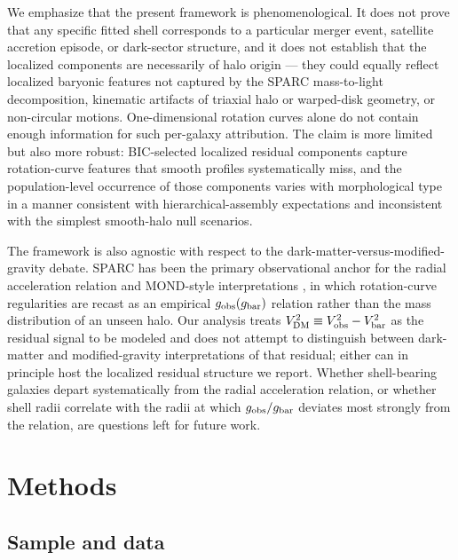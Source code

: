 We emphasize that the present framework is phenomenological. It does not prove that any specific fitted shell corresponds to a particular merger event, satellite accretion episode, or dark-sector structure, and it does not establish that the localized components are necessarily of halo origin --- they could equally reflect localized baryonic features not captured by the SPARC mass-to-light decomposition, kinematic artifacts of triaxial halo or warped-disk geometry, or non-circular motions. One-dimensional rotation curves alone do not contain enough information for such per-galaxy attribution. The claim is more limited but also more robust: BIC-selected localized residual components capture rotation-curve features that smooth profiles systematically miss, and the population-level occurrence of those components varies with morphological type in a manner consistent with hierarchical-assembly expectations and inconsistent with the simplest smooth-halo null scenarios.

The framework is also agnostic with respect to the dark-matter-versus-modified-gravity debate. SPARC has been the primary observational anchor for the radial acceleration relation and MOND-style interpretations \citep[][for a review of MOND in the rotation-curve context, see \citealt{FamaeyMcGaugh2012}]{McGaugh2016}, in which rotation-curve regularities are recast as an empirical $g_{\rm obs}(g_{\rm bar})$ relation rather than the mass distribution of an unseen halo. Our analysis treats $V^2_{\rm DM} \equiv V^2_{\rm obs} - V^2_{\rm bar}$ as the residual signal to be modeled and does not attempt to distinguish between dark-matter and modified-gravity interpretations of that residual; either can in principle host the localized residual structure we report. Whether shell-bearing galaxies depart systematically from the radial acceleration relation, or whether shell radii correlate with the radii at which $g_{\rm obs}/g_{\rm bar}$ deviates most strongly from the relation, are questions left for future work.

\section{Methods}
\label{sec:methods}

\subsection{Sample and data}
\label{sec:sample}

